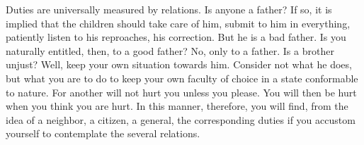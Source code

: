 Duties are universally measured by relations. Is anyone a father?
If so, it is implied that the children should take care of him, submit
to him in everything, patiently listen to his reproaches, his correction.
But he is a bad father. Is you naturally entitled, then, to a good
father? No, only to a father. Is a brother unjust? Well, keep your
own situation towards him. Consider not what he does, but what you
are to do to keep your own faculty of choice in a state conformable
to nature. For another will not hurt you unless you please. You will
then be hurt when you think you are hurt. In this manner, therefore,
you will find, from the idea of a neighbor, a citizen, a general,
the corresponding duties if you accustom yourself to contemplate the
several relations. 
